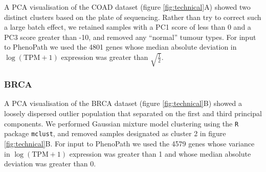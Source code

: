 A PCA visualisation of the COAD dataset (figure \ref{fig:technical}A) showed two distinct clusters based on the plate of sequencing. Rather than try to correct such a large batch effect, we retained samples with a PC1 score of less than 0 and a PC3 score greater than -10, and removed any ``normal'' tumour types. For input to PhenoPath we used the 4801 genes whose median absolute deviation in $\log(\text{TPM} + 1)$ expression was greater than $\sqrt{\frac{1}{2}}$.

\subsubsection{BRCA}

A PCA visualisation of the BRCA dataset (figure \ref{fig:technical}B) showed a loosely dispersed outlier population that separated on the first and third principal components. We performed Gaussian mixture model clustering using the \texttt{R} package \texttt{mclust}\cite{Fraley_undated-ug}, and removed samples designated as cluster 2 in figure \ref{fig:technical}B. For input to PhenoPath we used the 4579 genes whose variance in $\log(\text{TPM} + 1)$ expression was greater than 1 and whose median absolute deviation was greater than 0.
